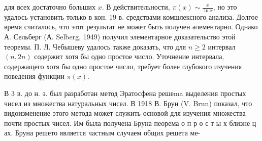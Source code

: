 \documentclass[10pt]{article}
\begin{document}
для всех достаточно больших $x$. В действительности, $\pi(x) \sim \frac{x}{\ln x}$, но это удалось установить только в кон. 19 в. средствами комшлексного анализа. Долгое время считалось, что этот результат не может быть получен әлементарно. Однако А. Сельберг (А. Selberg, 1949) получил элементарное доказательство этой теоремы. П. Л. Чебышеву удалось также доказать, что для $n \geqslant 2$ интервал $(n, 2 n)$ содержит хотя бы одно простое число. Уточнение интервала, содержащего хотя бы одно простое число, требует более глубокого изучения поведения функции $\pi(x)$.



В 3 в. до н. э. был разработан метод Эратосфена решеma выделения простых чисел из множества натуральных чисел. В 1918 В. Брун (V. Brun) показал, что видоизменение этого метода может служить основой для изучения множества почти простых чисел. Им была получена Бруна пеорема о п р о с т ы х близне ц ах. Бруна решето является частным случаем общих решета ме-
\end{document}
